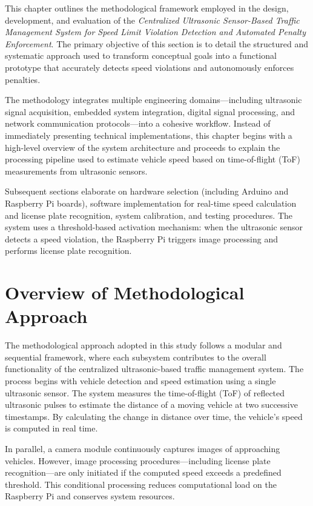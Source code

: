 This chapter outlines the methodological framework employed in the design, development, and evaluation of the \textit{Centralized Ultrasonic Sensor-Based Traffic Management System for Speed Limit Violation Detection and Automated Penalty Enforcement}. The primary objective of this section is to detail the structured and systematic approach used to transform conceptual goals into a functional prototype that accurately detects speed violations and autonomously enforces penalties.

The methodology integrates multiple engineering domains—including ultrasonic signal acquisition, embedded system integration, digital signal processing, and network communication protocols—into a cohesive workflow. Instead of immediately presenting technical implementations, this chapter begins with a high-level overview of the system architecture and proceeds to explain the processing pipeline used to estimate vehicle speed based on time-of-flight (ToF) measurements from ultrasonic sensors.

Subsequent sections elaborate on hardware selection (including Arduino and Raspberry Pi boards), software implementation for real-time speed calculation and license plate recognition, system calibration, and testing procedures. The system uses a threshold-based activation mechanism: when the ultrasonic sensor detects a speed violation, the Raspberry Pi triggers image processing and performs license plate recognition.

\section{Overview of Methodological Approach}
\label{sec:methodology-overview}

The methodological approach adopted in this study follows a modular and sequential framework, where each subsystem contributes to the overall functionality of the centralized ultrasonic-based traffic management system. The process begins with vehicle detection and speed estimation using a single ultrasonic sensor. The system measures the time-of-flight (ToF) of reflected ultrasonic pulses to estimate the distance of a moving vehicle at two successive timestamps. By calculating the change in distance over time, the vehicle's speed is computed in real time.

In parallel, a camera module continuously captures images of approaching vehicles. However, image processing procedures—including license plate recognition—are only initiated if the computed speed exceeds a predefined threshold. This conditional processing reduces computational load on the Raspberry Pi and conserves system resources.

